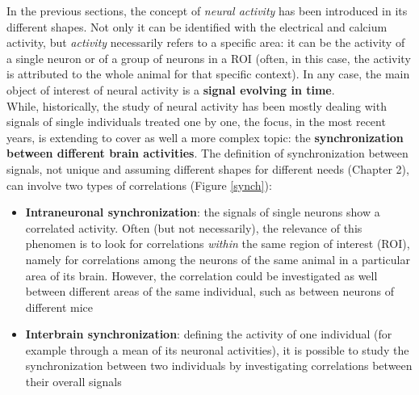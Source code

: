 \documentclass[12pt, a4paper]{article}
\begin{document}
In the previous sections, the concept of \textit{neural activity} has been introduced in its different shapes. Not only it can be identified with the electrical and calcium activity, but \textit{activity} necessarily refers to a specific area: it can be the activity of a single neuron or of a group of neurons in a ROI (often, in this case, the activity is attributed to the whole animal for that specific context). In any case, the main object of interest of neural activity is a \textbf{signal evolving in time}.\\
While, historically, the study of neural activity has been mostly dealing with signals of single individuals treated one by one, the focus, in the most recent years, is extending to cover as well a more complex topic: the \textbf{synchronization between different brain activities}. The definition of synchronization between signals, not unique and assuming different shapes for different needs (Chapter 2), can involve two types of correlations (Figure \ref{synch}):

\begin{itemize}
	
	\item \textbf{Intraneuronal synchronization}: the signals of  single neurons show a correlated activity. Often (but not necessarily), the relevance of this phenomen is to look for correlations \textit{within} the same region of interest (ROI), namely for correlations among the neurons of the same animal in a particular area of its brain. However, the correlation could be investigated as well between different areas of the same individual, such as between neurons of different mice
	
	\item \textbf{Interbrain synchronization}: defining the activity of one individual (for example through a mean of its neuronal activities), it is possible to study the synchronization between two individuals by investigating correlations between their overall signals
	
\end{itemize}
\end{document}
